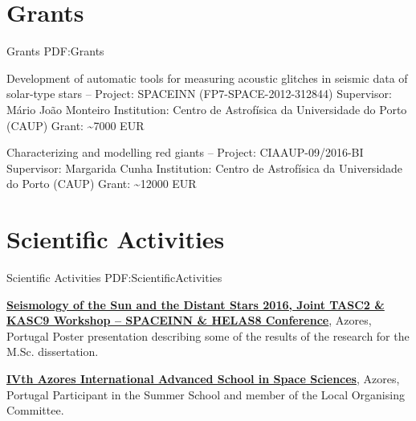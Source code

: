 \documentclass[letterpaper,10pt,oneside]{article}
\begin{document}
\begin{body}


\section
{Grants}
{Grants}
{PDF:Grants}

Development of automatic tools for measuring acoustic glitches in seismic data of solar-type stars
\hfill
{} --
\BulletItem
Project: SPACEINN (FP7-SPACE-2012-312844)
\BulletItem
Supervisor: Mário João Monteiro
\BulletItem
Institution: Centro de Astrofísica da Universidade do Porto (CAUP)
\BulletItem
Grant: \textasciitilde 7000 EUR


\BigGap
​Characterizing and modelling red giants
\hfill
{} --
\BulletItem
Project: ​CIAAUP-09/2016-BI
\BulletItem
Supervisor: Margarida Cunha
\BulletItem
Institution: Centro de Astrofísica da Universidade do Porto (CAUP)
\BulletItem
Grant: \textasciitilde 12000 EUR


\section
{Scientific Activities}
{Scientific Activities}
{PDF:ScientificActivities}

\href{http://www.iastro.pt/research/conferences/spacetk16/}
{\textbf{Seismology of the Sun and the Distant Stars 2016, Joint TASC2 \& KASC9 Workshop – SPACEINN \& HELAS8 Conference}},
Azores, Portugal
\hfill
{}
\GapNoBreak
\BulletItem
Poster presentation describing some of the results of the research for the M.Sc. dissertation.


\GapNoBreak
\href{http://www.iastro.pt/research/conferences/faial2016/}
{\textbf{IVth Azores International Advanced School in Space Sciences}},
Azores, Portugal
\hfill
{}
\GapNoBreak
\BulletItem
Participant in the Summer School and member of the Local Organising Committee.


\end{body}
\end{document}
